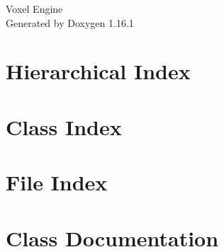 \documentclass[twoside]{book}
\newcommand{\+}{\discretionary{\mbox{\scriptsize$\hookleftarrow$}}{}{}}
\newcommand{\clearemptydoublepage}{%
    \newpage{\pagestyle{empty}\cleardoublepage}%
  }
\begin{document}
  \raggedbottom
    \hypersetup{pageanchor=false,
                bookmarksnumbered=true,
                pdfencoding=unicode
               }
  \begin{titlepage}
  \vspace*{7cm}
  \begin{center}%
  {\Large Voxel Engine}\\
  \vspace*{1cm}
  {\large Generated by Doxygen 1.16.1}\\
  \end{center}
  \end{titlepage}
  \clearemptydoublepage
  \tableofcontents
  \clearemptydoublepage
  \hypersetup{pageanchor=true}
\chapter{Hierarchical Index}

\chapter{Class Index}

\chapter{File Index}

\chapter{Class Documentation}












































\end{document}
